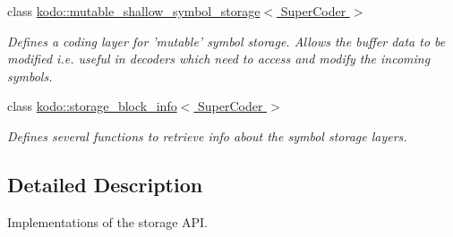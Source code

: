 \begin{DoxyCompactItemize}
class \hyperlink{classkodo_1_1mutable__shallow__symbol__storage}{kodo\-::mutable\-\_\-shallow\-\_\-symbol\-\_\-storage$<$ Super\-Coder $>$}
\begin{DoxyCompactList}\small\item\em Defines a coding layer for 'mutable' symbol storage. Allows the buffer data to be modified i.\-e. useful in decoders which need to access and modify the incoming symbols. \end{DoxyCompactList}\item 
class \hyperlink{classkodo_1_1storage__block__info}{kodo\-::storage\-\_\-block\-\_\-info$<$ Super\-Coder $>$}
\begin{DoxyCompactList}\small\item\em Defines several functions to retrieve info about the symbol storage layers. \end{DoxyCompactList}\end{DoxyCompactItemize}


\subsection{Detailed Description}
Implementations of the storage A\-P\-I. 